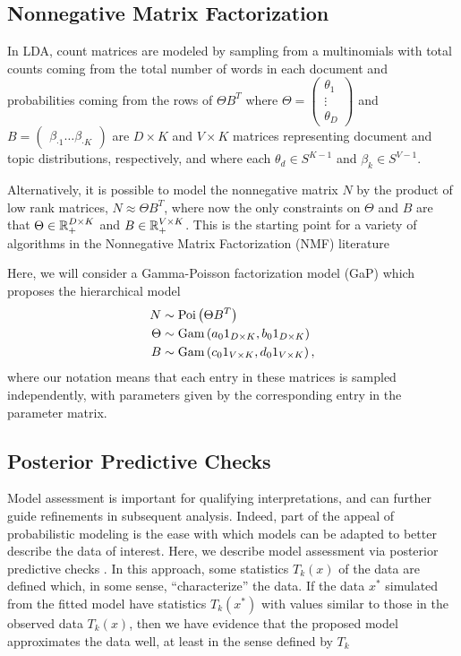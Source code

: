\documentclass[oupdraft]{bio}
\begin{document}
\subsection{Nonnegative Matrix Factorization}
\label{sec:nmf}

In LDA, count matrices are modeled by sampling from a multinomials with total
counts coming from the total number of words in each document and probabilities
coming from the rows of $\Theta B^{T}$ where $\Theta = \begin{pmatrix}\theta_{1}
  \\ \vdots \\ \theta_{D} \end{pmatrix}$ and $B = \begin{pmatrix} \beta_{\cdot 1}
  \dots \beta_{\cdot K} \end{pmatrix}$ are $D \times K$ and $V \times K$ matrices
representing document and topic distributions, respectively, and where each
$\theta_{d} \in S^{K - 1}$ and $\beta_{k} \in S^{V - 1}$.


Alternatively, it is possible to model the nonnegative matrix $N$ by the product
of low rank matrices, $N \approx \Theta B^{T}$, where now the only constraints
on $\Theta$ and $B$ are that $\Theta \in \mathbb{R}_{+}^{D \times K}$ and $B \in
\mathbb{R}_{+}^{V \times K}$. This is the starting point for a variety of algorithms
in the Nonnegative Matrix Factorization (NMF) literature
\citep{wang2013nonnegative, berry2007algorithms, lee2001algorithms}

Here, we will consider a Gamma-Poisson factorization model (GaP)
\citep{kucukelbir2015automatic, canny2004gap} which proposes the hierarchical
model
\begin{align*}
N &\sim \textnormal{Poi}\left(\Theta B^{T}\right) \\
\Theta &\sim \textnormal{Gam}\left(a_{0} 1_{D \times K}, b_{0} 1_{D \times K}\right) \\
B &\sim \textnormal{Gam}\left(c_{0} 1_{V \times K}, d_{0} 1_{V \times K} \right),
\end{align*}
where our notation means that each entry in these matrices is sampled
independently, with parameters given by the corresponding entry in the parameter
matrix.

\subsection{Posterior Predictive Checks}
\label{sec:ppc_overview}

Model assessment is important for qualifying interpretations, and can further
guide refinements in subsequent analysis. Indeed, part of the appeal of
probabilistic modeling is the ease with which models can be adapted to better
describe the data of interest. Here, we describe model assessment via posterior
predictive checks \citep{rubin1984bayesianly, gelman2013philosophy}. In this
approach, some statistics $T_{k}\left(x\right)$ of the data are defined which,
in some sense, ``characterize'' the data. If the data $x^{\ast}$ simulated from
the fitted model have statistics $T_{k}\left(x^{\ast}\right)$ with values
similar to those in the observed data $T_{k}\left(x\right)$, then we have
evidence that the proposed model approximates the data well, at least in the
sense defined by $T_{k}$
\end{document}
